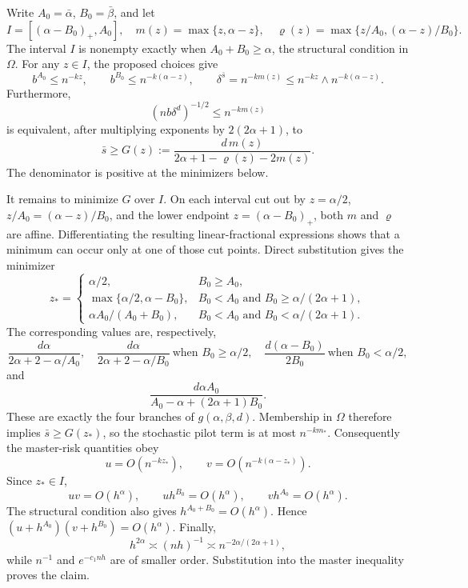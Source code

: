 Write \(A_0=\bar\alpha\), \(B_0=\bar\beta\), and let
\[
I=[(\alpha-B_0)_+,A_0],\quad
m(z)=\max\{z,\alpha-z\},\quad
\varrho(z)=\max\{z/A_0,(\alpha-z)/B_0\}.
\]
The interval \(I\) is nonempty exactly when \(A_0+B_0\ge\alpha\), the structural condition in \(\Omega\). For any \(z\in I\), the proposed choices give
\[
b^{A_0}\le n^{-kz},\qquad b^{B_0}\le n^{-k(\alpha-z)},\qquad
\delta^{\bar s}=n^{-km(z)}\le n^{-kz}\wedge n^{-k(\alpha-z)}.
\]
Furthermore,
\[
(nb\delta^d)^{-1/2}\le n^{-km(z)}
\]
is equivalent, after multiplying exponents by \(2(2\alpha+1)\), to
\[
\bar s\ge G(z):=\frac{d\,m(z)}{2\alpha+1-\varrho(z)-2m(z)}.
\]
The denominator is positive at the minimizers below.

It remains to minimize \(G\) over \(I\). On each interval cut out by \(z=\alpha/2\), \(z/A_0=(\alpha-z)/B_0\), and the lower endpoint \(z=(\alpha-B_0)_+\), both \(m\) and \(\varrho\) are affine. Differentiating the resulting linear-fractional expressions shows that a minimum can occur only at one of those cut points. Direct substitution gives the minimizer
\[
z_*=\begin{cases}
\alpha/2,&B_0\ge A_0,\\
\max\{\alpha/2,\alpha-B_0\},&B_0<A_0\text{ and }B_0\ge\alpha/(2\alpha+1),\\
\alpha A_0/(A_0+B_0),&B_0<A_0\text{ and }B_0<\alpha/(2\alpha+1).
\end{cases}
\]
The corresponding values are, respectively,
\[
\frac{d\alpha}{2\alpha+2-\alpha/A_0},
\quad
\frac{d\alpha}{2\alpha+2-\alpha/B_0}
\ \text{when }B_0\ge\alpha/2,
\quad
\frac{d(\alpha-B_0)}{2B_0}
\ \text{when }B_0<\alpha/2,
\]
and
\[
\frac{d\alpha A_0}{A_0-\alpha+(2\alpha+1)B_0}.
\]
These are exactly the four branches of \(g(\alpha,\beta,d)\). Membership in \(\Omega\) therefore implies \(\bar s\ge G(z_*)\), so the stochastic pilot term is at most \(n^{-km_*}\). Consequently the master-risk quantities obey
\[
u=O(n^{-kz_*}),\qquad v=O(n^{-k(\alpha-z_*)}).
\]
Since \(z_*\in I\),
\[
uv=O(h^\alpha),\qquad uh^{B_0}=O(h^\alpha),\qquad vh^{A_0}=O(h^\alpha).
\]
The structural condition also gives \(h^{A_0+B_0}=O(h^\alpha)\). Hence \((u+h^{A_0})(v+h^{B_0})=O(h^\alpha)\). Finally,
\[
h^{2\alpha}\asymp (nh)^{-1}\asymp n^{-2\alpha/(2\alpha+1)},
\]
while \(n^{-1}\) and \(e^{-c_1nh}\) are of smaller order. Substitution into the master inequality proves the claim.